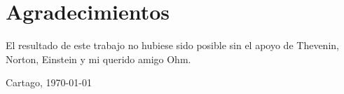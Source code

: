 \chapter*{Agradecimientos}
\thispagestyle{empty}

El resultado de este trabajo no hubiese sido posible sin el apoyo de Thevenin,
Norton, Einstein y mi querido amigo Ohm.

\vspace*{1cm}

\scriptAuthor

Cartago, \today

\cleardoublepage

